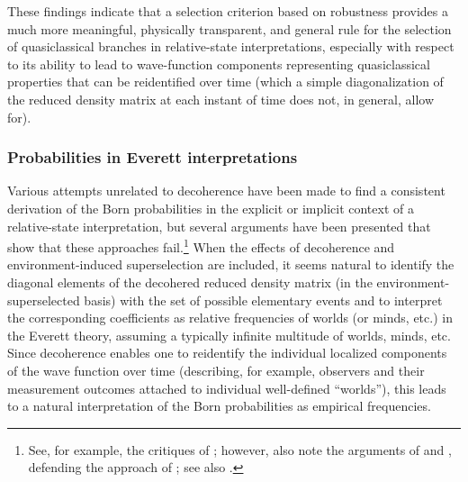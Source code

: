 \documentclass[twocolumn,rmp,aps,amsmath,amsfonts,noshowkeys,noshowpacs]{revtex4}
\begin{document}
These findings indicate that a selection criterion based on robustness
provides a much more meaningful, physically transparent, and general
rule for the selection of quasiclassical branches in relative-state
interpretations, especially with respect to its ability to lead to
wave-function components representing quasiclassical properties that
can be reidentified over time (which a simple diagonalization of the
reduced density matrix at each instant of time does not, in general,
allow for).


\subsubsection{Probabilities in Everett interpretations}

Various attempts unrelated to decoherence have been made to find a
consistent derivation of the Born probabilities \citep[for
instance,][]{Everett:1957:rw,Hartle:1968:gg,DeWitt:1971:pz,%
  Graham:1973:ww,Geroch:1984:yt,Deutsch:1999:tz} in the explicit or
implicit context of a relative-state interpretation, but several
arguments have been presented that show that these approaches
fail.\footnote{See, for example, the critiques of
  \citet{Stein:1984:uu,Kent:1990:nm,Squires:1990:lz,Barnum:2000:oz};
  however, also note the arguments of \citet{Wallace:2003:zr} and
  \citet{Gill:2003:tz}, defending the approach of
  \citet{Deutsch:1999:tz}; see also \citet{Saunders:2002:tz}.}  When
the effects of decoherence and environment-induced superselection are
included, it seems natural to identify the diagonal elements of the
decohered reduced density matrix (in the environment-superselected
basis) with the set of possible elementary events and to interpret the
corresponding coefficients as relative frequencies of worlds (or
minds, etc.) in the Everett theory, assuming a typically infinite
multitude of worlds, minds, etc.  Since decoherence enables one to
reidentify the individual localized components of the wave function
over time (describing, for example, observers and their measurement
outcomes attached to individual well-defined ``worlds''), this leads
to a natural interpretation of the Born probabilities as empirical
frequencies.
\end{document}
